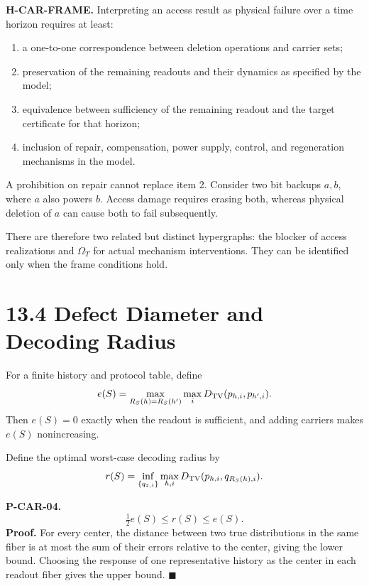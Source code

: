 \documentclass[
  english,
  11pt,
  oneside]{book}
\providecommand{\tightlist}{%
  \setlength{\itemsep}{0pt}\setlength{\parskip}{0pt}}
\begin{document}
\textbf{H-CAR-FRAME.} Interpreting an access result as physical failure over a time horizon requires at least:

\begin{enumerate}
\def\labelenumi{\arabic{enumi}.}
\tightlist
\item
  a one-to-one correspondence between deletion operations and carrier sets;
\item
  preservation of the remaining readouts and their dynamics as specified by the model;
\item
  equivalence between sufficiency of the remaining readout and the target certificate for that horizon;
\item
  inclusion of repair, compensation, power supply, control, and regeneration mechanisms in the model.
\end{enumerate}

A prohibition on repair cannot replace item 2. Consider two bit backups \(a,b\), where \(a\) also powers \(b\). Access damage requires erasing both, whereas physical deletion of \(a\) can cause both to fail subsequently.

There are therefore two related but distinct hypergraphs: the blocker of access realizations and \(\Omega_T\) for actual mechanism interventions. They can be identified only when the frame conditions hold.

\section{13.4 Defect Diameter and Decoding Radius}\label{defect-diameter-and-decoding-radius}

For a finite history and protocol table, define \[e(S)=\max_{R_S(h)=R_S(h')}\max_i
D_{\rm TV}(p_{h,i},p_{h',i}).\] Then \(e(S)=0\) exactly when the readout is sufficient, and adding carriers makes \(e(S)\) nonincreasing.

Define the optimal worst-case decoding radius by \[r(S)=\inf_{\{q_{z,i}\}}\max_{h,i}
D_{\rm TV}(p_{h,i},q_{R_S(h),i}).\]

\hypertarget{p-car-04}{}\label{p-car-04}

\textbf{P-CAR-04.} \[\tfrac12e(S)\le r(S)\le e(S).\] \textbf{Proof.} For every center, the distance between two true distributions in the same fiber is at most the sum of their errors relative to the center, giving the lower bound. Choosing the response of one representative history as the center in each readout fiber gives the upper bound. \(\blacksquare\)
\end{document}
